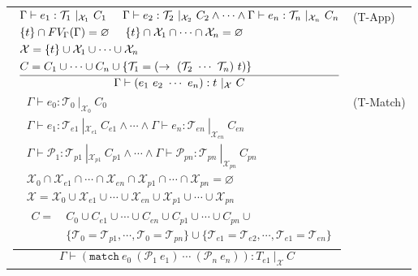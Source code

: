 \documentclass{article}
\begin{document}
\begin{figure}[tb]
\begin{tabular}{rlrl}
        \multicolumn{3}{r}{
        $\dfrac{
            \begin{aligned}
                &\Gamma \vdash e_1 : \mathcal{T}_1\ |_{\mathcal{X}_1}\ C_1 \hspace{5mm}
                    \Gamma \vdash e_2 : \mathcal{T}_2\ |_{\mathcal{X}_2}\ C_2 \land \cdots \land \Gamma \vdash e_n : \mathcal{T}_n\ |_{\mathcal{X}_n}\ C_n \\
                &\{t\} \cap FV_\Gamma(\Gamma) = \varnothing \hspace{5mm} \{t\} \cap \mathcal{X}_1 \cap \cdots \cap \mathcal{X}_n = \varnothing\\
                &\mathcal{X} = \{t\} \cup \mathcal{X}_1 \cup \cdots \cup \mathcal{X}_n \\
                &C = C_1 \cup \cdots \cup C_n \cup \{ \mathcal{T}_1 = (\rightarrow\ (\mathcal{T}_2\ \cdots\ \mathcal{T}_n)\ t) \}
            \end{aligned}
        }{
            \Gamma \vdash (e_1\ e_2\ \cdots\ e_n) : t\ |_\mathcal{X}\ C
        }$} & (T-App) \vspace{5mm} \\

        \multicolumn{3}{r}{
        $\dfrac{
            \begin{aligned}
                &\Gamma \vdash e_0 : \mathcal{T}_0\ |_{\mathcal{X}_0}\ C_0 \\
                &\Gamma \vdash e_1 : \mathcal{T}_{e1}\ |_{\mathcal{X}_{e1}}\ C_{e1} \land \cdots \land \Gamma \vdash e_n : \mathcal{T}_{en}\ |_{\mathcal{X}_{en}}\ C_{en} \\
                &\Gamma \vdash \mathcal{P}_1 : \mathcal{T}_{p1}\ |_{\mathcal{X}_{p1}}\ C_{p1} \land \cdots \land \Gamma \vdash \mathcal{P}_{pn} : \mathcal{T}_{pn}\ |_{\mathcal{X}_{pn}}\ C_{pn} \\
                &\mathcal{X}_0 \cap \mathcal{X}_{e1} \cap \cdots \cap \mathcal{X}_{en} \cap \mathcal{X}_{p1} \cap \cdots \cap \mathcal{X}_{pn} = \varnothing \\
                &\mathcal{X} = \mathcal{X}_0 \cup \mathcal{X}_{e1} \cup \cdots \cup \mathcal{X}_{en} \cup \mathcal{X}_{p1} \cup \cdots \cup \mathcal{X}_{pn} \\
                &\begin{aligned}
                    C =\ &C_0 \cup C_{e1} \cup \cdots \cup C_{en} \cup C_{p1} \cup \cdots \cup C_{pn} \cup \\
                         &\{\mathcal{T}_0 = \mathcal{T}_{p1}, \cdots, \mathcal{T}_0 = \mathcal{T}_{pn}\} \cup
                         \{\mathcal{T}_{e1} = \mathcal{T}_{e2}, \cdots, \mathcal{T}_{e1} = \mathcal{T}_{en}\}
                \end{aligned}
            \end{aligned}
        }{
            \Gamma \vdash (\mathtt{match}\ e_0\ (\mathcal{P}_1\ e_1)\ \cdots\ (\mathcal{P}_n\ e_n)) : T_{e1}\ |_\mathcal{X}\ C
        }$} & (T-Match) \vspace{5mm} \\


\end{tabular}
\end{figure}
\end{document}
